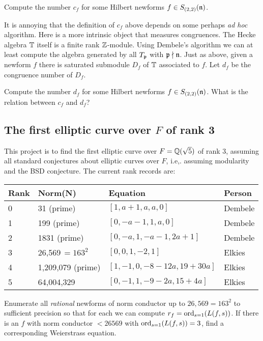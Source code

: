 \documentclass{article}
\begin{document}
\vspace{1em}
 Compute the number $c_f$ for some Hilbert
newforms $f \in S_{(2,2)}(\mathfrak{n})$.


It is annoying that the definition of $c_f$ above depends on some
perhaps {\em ad hoc} algorithm.  Here is a more intrinsic object that
measures congruences.  The Hecke algebra $\mathbb{T}$ itself is a finite rank
$\mathbb{Z}$-module.  Using Dembele's algorithm we can at least compute the
algebra generated by all $T_{\mathfrak{p}}$ with $\mathfrak{p}\nmid\mathfrak{n}$.  Just as above,
given a newform $f$ there is saturated submodule $D_f$ of $\mathbb{T}$
associated to $f$.    Let $d_f$ be the congruence number of $D_f$.

\vspace{1em}
 Compute the number $d_f$ for some
Hilbert newforms $f \in S_{(2,2)}(\mathfrak{n})$.  What is the relation between
$c_f$ and $d_f$?


\subsection{The first elliptic curve over $F$ of  rank 3}
This project is to find the first elliptic curve over $F=\mathbb{Q}(\sqrt{5})$
of rank 3, assuming all standard conjectures about elliptic curves
over $F$, i.e,. assuming modularity and the BSD conjecture. 
The current rank records are:
\begin{center}
\begin{tabular}{|l|l|l|l|}\hline
Rank & Norm(N) & Equation & Person\\\hline
0 & 31 (prime) &  $[1,a+1,a,a,0]$ &  Dembele \\
1 & 199 (prime) &  $[0,-a-1,1,a,0]$ &  Dembele \\
2 & 1831 (prime) &  $[0,-a,1,-a-1,2a+1]$ & Dembele \\
3 & 26,569$\,=163^2$ &  $[0,0,1,-2,1]$ & Elkies \\
4 & 1,209,079 (prime) & $[1, -1, 0, -8-12a, 19+30a]$ & Elkies \\
5 & 64,004,329 & $[0, -1, 1, -9-2a, 15+4a]$ & Elkies
\\\hline
\end{tabular}
\end{center}

\vspace{1em}
Enumerate all {\em rational} newforms of norm conductor up to
$26,569=163^2$ to sufficient precision so that for each we can compute
$r_f = \operatorname{ord}_{s=1}(L(f,s))$.  If there is an $f$ with norm conductor
$<26569$ with $\operatorname{ord}_{s=1}(L(f,s))=3$, find a corresponding Weierstrass
equation.
\end{document}
